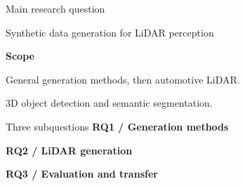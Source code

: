 \begin{frame}{Main research question}
\begin{block}{Synthetic data generation for LiDAR perception}
\MainResearchQuestion
\end{block}
\vspace{4mm}
\textbf{Scope}\par
General generation methods, then automotive LiDAR.\par
3D object detection and semantic segmentation.
\end{frame}

\begin{frame}{Three subquestions}
\small
\textbf{RQ1 / Generation methods}\par
\GenerationQuestion
\vspace{3mm}

\textbf{RQ2 / LiDAR generation}\par
\LidarQuestion
\vspace{3mm}

\textbf{RQ3 / Evaluation and transfer}\par
\EvaluationQuestion
\end{frame}
